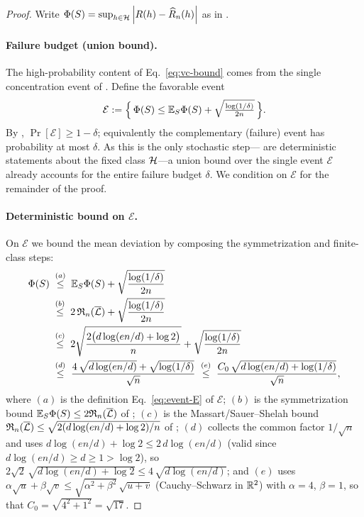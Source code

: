 \begin{proof}
Write $\Phi(S)=\sup_{h\in\mathcal{H}}\left| R(h)-\widehat{R}_n(h) \right|$ as in
.

\paragraph{Failure budget (union bound).}
The high-probability content of Eq.~\eqref{eq:vc-bound} comes from the single
concentration event of . Define the favorable event
\begin{align}\label{eq:event-E}
\mathcal{E}:=\Bigl\{\,\Phi(S)\le\mathbb{E}_S\Phi(S)+\sqrt{\tfrac{\log(1/\delta)}{2n}}\,\Bigr\}.
\end{align}
By , $\Pr[\mathcal{E}]\ge1-\delta$; equivalently the
complementary (failure) event has probability at most $\delta$. As this is the
only stochastic step--- are deterministic statements about the fixed class
$\mathcal{H}$---a union bound over the single event $\mathcal{E}$ already accounts for
the entire failure budget $\delta$. We condition on $\mathcal{E}$ for the
remainder of the proof.

\paragraph{Deterministic bound on $\mathcal{E}$.}
On $\mathcal{E}$ we bound the mean deviation by composing the symmetrization and
finite-class steps:
\begin{align}
\Phi(S)
&\;\overset{(a)}{\le}\;\mathbb{E}_S\Phi(S)+\sqrt{\frac{\log(1/\delta)}{2n}}
\notag\\
&\;\overset{(b)}{\le}\;2\,\mathfrak{R}_n(\overline{\mathcal{L}})+\sqrt{\frac{\log(1/\delta)}{2n}}
\notag\\
&\;\overset{(c)}{\le}\;2\sqrt{\frac{2\bigl(d\log(en/d)+\log 2\bigr)}{n}}
   +\sqrt{\frac{\log(1/\delta)}{2n}}
\notag\\
&\;\overset{(d)}{\le}\;\frac{4\,\sqrt{d\log(en/d)}+\sqrt{\log(1/\delta)}}
   {\sqrt{n}}
\;\overset{(e)}{\le}\;\frac{C_0\,\sqrt{d\log(en/d)+\log(1/\delta)}}{\sqrt{n}},
\label{eq:assemble}
\end{align}
where $(a)$ is the definition Eq.~\eqref{eq:event-E} of $\mathcal{E}$; $(b)$ is the
symmetrization bound $\mathbb{E}_S\Phi(S)\le2\mathfrak{R}_n(\overline{\mathcal{L}})$ of
; $(c)$ is the Massart/Sauer--Shelah bound
$\mathfrak{R}_n(\overline{\mathcal{L}})\le\sqrt{2(d\log(en/d)+\log 2)/n}$ of
; $(d)$ collects the common factor $1/\sqrt n$ and
uses $d\log(en/d)+\log 2\le 2\,d\log(en/d)$ (valid since $d\log(en/d)\ge d\ge1
>\log 2$), so $2\sqrt2\,\sqrt{d\log(en/d)+\log 2}\le4\,\sqrt{d\log(en/d)}$; and
$(e)$ uses $\alpha\sqrt{u}+\beta\sqrt{v}\le\sqrt{\alpha^2+\beta^2}\,\sqrt{u+v}$
(Cauchy--Schwarz in $\mathbb{R}^2$) with $\alpha=4$, $\beta=1$, so that
$C_0=\sqrt{4^2+1^2}=\sqrt{17}$.


\end{proof}
